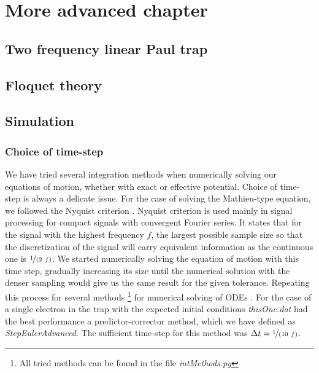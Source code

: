 \chapter{More advanced chapter}
\label{chap:math}


\section{Two frequency linear Paul trap}

\cite{leefer2017investigation}
\cite{FOOT2018117}

\section{Floquet theory}
\label{sec:floquet}


\section{Simulation}
\label{simulation}

\subsection{Choice of time-step}

We have tried several integration methods when numerically solving our equations of motion, whether with exact or effective potential.
Choice of time-step is always a delicate issue. For the case of solving the Mathieu-type equation, we followed the Nyquist criterion . Nyquist criterion is used mainly in signal processing for compact signals with convergent Fourier series. It states that for the signal with the highest frequency $f$, the largest possible sample size so that the discretization of the signal will carry equivalent information as the continuous one is $\nicefrac{1}{(2 \ f)}$. We started numerically solving the equation of motion with this time step, gradually increasing its size until the numerical solution with the denser sampling would give us the same result for the given tolerance. Repeating this process for several methods \footnote{All tried methods can be found in the file \textit{intMethods.py}} for numerical solving of ODEs \cite{teukolsky1992numerical}. For the case of a single electron in the trap with the expected initial conditions \textit{thisOne.dat} had the best performance a predictor-corrector method, which we have defined as \textit{StepEulerAdvanced}. The sufficient time-step for this method was $\Delta t = \nicefrac{1}{(10 \ f)}$. 


